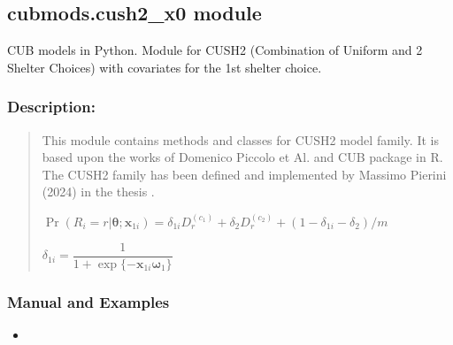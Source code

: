 \documentclass[letterpaper,10pt,english]{sphinxmanual}
\begin{document}
\subsection{cubmods.cush2\_x0 module}
\label{\detokenize{cubmods:module-cubmods.cush2_x0}}\label{\detokenize{cubmods:cubmods-cush2-x0-module}}\label{\detokenize{cubmods:cush2x0-module}}
\sphinxAtStartPar
CUB models in Python.
Module for CUSH2 (Combination of Uniform
and 2 Shelter Choices) with covariates
for the 1st shelter choice.


\subsubsection{Description:}
\label{\detokenize{cubmods:id505}}\begin{quote}

\sphinxAtStartPar
This module contains methods and classes
for CUSH2 model family.
It is based upon the works of Domenico
Piccolo et Al. and CUB package in R.
The CUSH2 family has been defined and implemented
by Massimo Pierini (2024) in the thesis
.

\sphinxAtStartPar
\(\Pr(R_i=r|\pmb \theta;\pmb x_{1i}) = \delta_{1i} D_r^{(c_1)} + \delta_2 D_r^{(c_2)} + (1 - \delta_{1i} - \delta_2)/m\)

\sphinxAtStartPar
\(\delta_{1i} = \dfrac{1}{1+\exp\{ - \pmb x_{1i} \pmb \omega_1 \}}\)
\end{quote}


\subsubsection{Manual and Examples}
\label{\detokenize{cubmods:id506}}\begin{itemize}
\item {} 
\sphinxAtStartPar
{}

\end{itemize}
\end{document}
